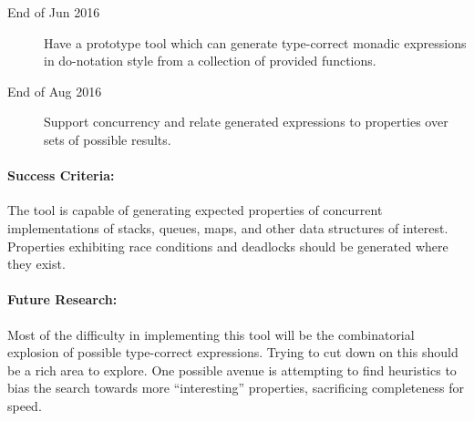 \begin{description}
\item[End of Jun 2016] Have a prototype tool which can generate
  type-correct monadic expressions in do-notation style from a
  collection of provided functions.

\item[End of Aug 2016] Support concurrency and relate generated
  expressions to properties over sets of possible results.
\end{description}

\paragraph{Success Criteria:}

The tool is capable of generating expected properties of concurrent
implementations of stacks, queues, maps, and other data structures of
interest. Properties exhibiting race conditions and deadlocks should
be generated where they exist.

\paragraph{Future Research:}

Most of the difficulty in implementing this tool will be the
combinatorial explosion of possible type-correct expressions. Trying
to cut down on this should be a rich area to explore. One possible
avenue is attempting to find heuristics to bias the search towards
more ``interesting'' properties, sacrificing completeness for speed.
